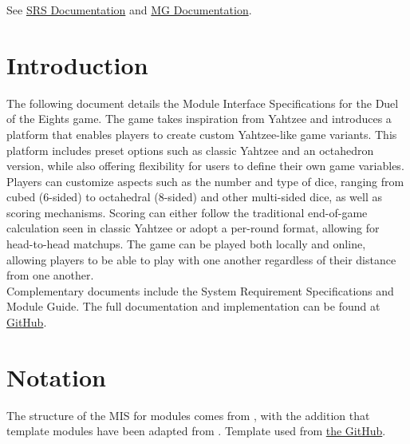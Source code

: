 \documentclass[12pt, titlepage]{article}
\begin{document}
See \href{https://github.com/John-Popovici/duel-of-the-eights/blob/main/docs/SRS/SRS.pdf}{SRS Documentation} and \href{file:///C:/Users/a/Documents/Coding/duel-of-the-eights/docs/Design/SoftArchitecture/MG.pdf}{MG Documentation}.


\section{Introduction}

The following document details the Module Interface Specifications for the Duel of the Eights game. The game takes inspiration from Yahtzee and introduces a platform that enables players to create custom Yahtzee-like game variants. This platform includes preset options such as classic Yahtzee and an octahedron version, while also offering flexibility for users to define their own game variables. Players can customize aspects such as the number and type of dice, ranging from cubed (6-sided) to octahedral (8-sided) and other multi-sided dice, as well as scoring mechanisms. Scoring can either follow the traditional end-of-game calculation seen in classic Yahtzee or adopt a per-round format, allowing for head-to-head matchups. The game can be played both locally and online, allowing players to be able to play with one another regardless of their distance from one another.\\

Complementary documents include the System Requirement Specifications
and Module Guide.  The full documentation and implementation can be
found at \href{https://github.com/John-Popovici/duel-of-the-eights/tree/main}{GitHub}.

\newpage
\section{Notation}


The structure of the MIS for modules comes from \citet{HoffmanAndStrooper1995},
with the addition that template modules have been adapted from
\cite{GhezziEtAl2003}. Template used from \href{https://github.com/smiths/capTemplate}{the \progname GitHub}.\\
\end{document}
